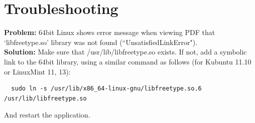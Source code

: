 \documentclass[a4paper]{book}
\begin{document}
\chapter{Troubleshooting}
\begin{tight_itemize}
	\item \textbf{Problem:} 64bit Linux shows error message when viewing PDF 
	that `libfreetype.so' library was not found (``UnsatisfiedLinkError"). \\
	\textbf{Solution:} Make sure that /usr/lib/libfreetype.so exists. If not, 
	add a symbolic link to the 64bit library, using a similar command as 
	follows (for Kubuntu 11.10 or LinuxMint 11, 13):
\begin{verbatim}
  sudo ln -s /usr/lib/x86_64-linux-gnu/libfreetype.so.6 /usr/lib/libfreetype.so
\end{verbatim}
    And restart the application.
\end{tight_itemize}


\end{document}
